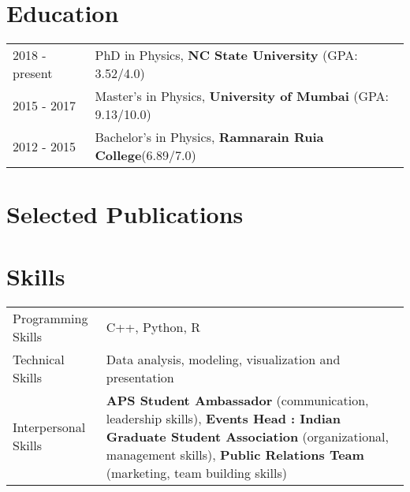 \documentclass[a4paper,12pt]{article}
\begin{document}
\section{Education}
\begin{tabularx}{\linewidth}{@{}l X@{}}	
2018 - present & PhD in Physics, \textbf{NC State University} \hfill \normalsize (GPA: 3.52/4.0) \\

2015 - 2017 & Master's in Physics, \textbf{University of Mumbai} \hfill (GPA: 9.13/10.0) \\ 

2012 - 2015 & Bachelor's in Physics, \textbf{Ramnarain Ruia College}\hfill  (6.89/7.0) \\

\end{tabularx}

\section{Selected Publications}
\begin{refsection}
\nocite{*}
\printbibliography[heading=none]
\end{refsection}

\section{Skills}
\begin{tabularx}{\linewidth}{@{}l X@{}}
Programming Skills &  \normalsize{C++, Python, R}\\
Technical Skills  &  \normalsize{Data analysis, modeling, visualization and presentation}\\
Interpersonal Skills  &  \normalsize{\textbf{APS Student Ambassador} (communication, leadership skills), \newline \textbf{Events Head : Indian Graduate Student Association} (organizational, management skills), \textbf{Public Relations Team} (marketing, team building skills)}\\
\end{tabularx}

\vfill
\end{document}
